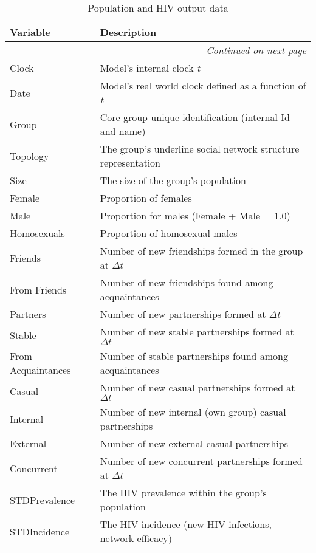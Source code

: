 \begin{longtable}[c]{|l|p{10.9cm}|}
\caption{Population and HIV output data}\\\hline
\bfseries Variable & \bfseries Description\\\hline\hline
\endhead
\multicolumn{2}{r}{\emph{Continued on next page}}
\endfoot
\endlastfoot
\label{modeloutput}
Run             & The replication number \\\hline
Clock           & Model's internal clock \emph{t} \\\hline
Date            & Model's real world clock defined as a function of \emph{t}  \\\hline
Group           & Core group unique identification (internal Id and name) \\\hline
Topology        & The group's underline social network structure representation \\\hline
Size            & The size of the group's population \\\hline
Female          & Proportion of females \\\hline
Male            & Proportion for males (Female + Male = 1.0) \\\hline
Homosexuals     & Proportion of homosexual males \\\hline
Friends         & Number of new friendships formed in the group at $\Delta t$ \\\hline
From Friends    & Number of new friendships found among acquaintances \\\hline
Partners        & Number of new partnerships formed at $\Delta t$ \\\hline
Stable          & Number of new stable partnerships formed at $\Delta t$ \\\hline
From Acquaintances & Number of stable partnerships found among acquaintances \\\hline
Casual          & Number of new casual partnerships formed at $\Delta t$ \\\hline
Internal        & Number of new internal (own group) casual partnerships \\\hline
External        & Number of new external casual partnerships \\\hline
Concurrent      & Number of new concurrent partnerships formed at $\Delta t$ \\\hline
STDPrevalence   & The HIV prevalence  within the group's population \\\hline
STDIncidence    & The HIV incidence (new HIV infections, network efficacy) \\\hline

\end{longtable}
